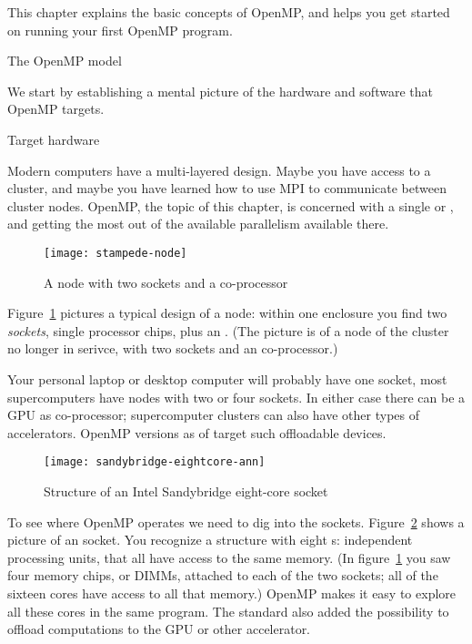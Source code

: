 
This chapter explains the basic concepts of OpenMP, and helps you get
started on running your first OpenMP program.

 {The OpenMP model}

We start by establishing a mental picture of the hardware and software
that OpenMP targets.

 {Target hardware}

Modern computers have a multi-layered design. Maybe you have access to
a cluster, and maybe you have learned how to use MPI to communicate
between cluster nodes. OpenMP, the topic of this chapter, is concerned
with a single  or ,
and getting the most out of the available parallelism available there.

\begin{figure}[ht]
\texttt{[image: stampede-node]}
\caption{A node with two sockets and a co-processor}
\label{fig:stampedenode}
\end{figure}
%
Figure~\ref{fig:stampedenode} pictures a typical design of a node:
within one enclosure you find two \emph{sockets},
single processor chips, plus an .
(The picture is of a node of the  cluster
no longer in serivce, with two
sockets and an  co-processor.)

Your personal laptop or desktop computer will probably
have one socket,
most supercomputers have nodes with two or four sockets.
In either case there can be a \ac{GPU} as co-processor;
supercomputer clusters can also have other types of accelerators.
OpenMP versions as of  target such offloadable devices.

\begin{figure}[ht]
  \texttt{[image: sandybridge-eightcore-ann]}
  \caption{Structure of an Intel Sandybridge eight-core socket}
  \label{fig:sandybridge}
\end{figure}
%
To see where OpenMP operates we need to dig into the
sockets. Figure~\ref{fig:sandybridge} shows a picture of an
 socket. You recognize a structure
with eight s: independent processing
units, that all have access to the same memory.
(In
figure~\ref{fig:stampedenode} you saw four memory chips,
or DIMMs,
attached to
each of the two sockets; all of the sixteen cores have access to all
that memory.)
OpenMP makes it easy to explore all these cores in the same program.
The  standard also added the possibility
to offload computations to the GPU or other accelerator.


